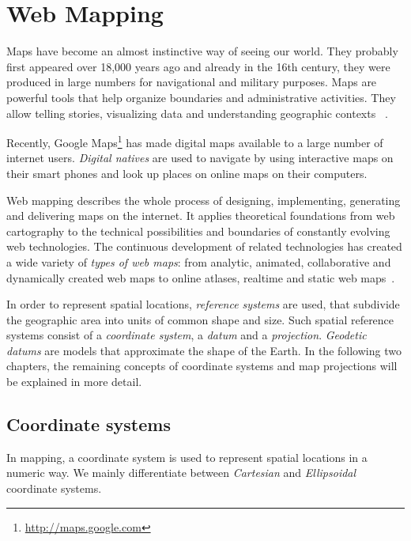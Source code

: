 
%
%

\section{Web Mapping}

Maps have become an almost instinctive way of seeing our world. They probably first appeared over 18,000 years ago and already in the 16th century, they were produced in large numbers for navigational and military purposes. Maps are powerful tools that help organize boundaries and administrative activities. They allow telling stories, visualizing data and understanding geographic contexts
~\cite{Zzolo11mappingdrupal}.

Recently, Google Maps\footnote{\url{http://maps.google.com}} has made digital maps available to a large number of internet users. \textit{Digital natives} are used to navigate by using interactive maps on their smart phones and look up places on online maps on their computers.

Web mapping describes the whole process of designing, implementing, generating and delivering maps on the internet. It applies theoretical foundations from web cartography to the technical possibilities and boundaries of constantly evolving web technologies. The continuous development of related technologies has created a wide variety of \textit{types of web maps}: from analytic, animated, collaborative and dynamically created web maps to online atlases, realtime and static web maps~\cite{wiki:web-mapping}.

In order to represent spatial locations, \textit{reference systems} are used, that subdivide the geographic area into units of common shape and size. Such spatial reference systems consist of a \textit{coordinate system}, a \textit{datum} and a \textit{projection}. \textit{Geodetic datums} are models that approximate the shape of the Earth. In the following two chapters, the remaining concepts of coordinate systems and map projections will be explained in more detail.

\subsection{Coordinate systems}
\label{chapter:coordinates}

In mapping, a coordinate system is used to represent spatial locations in a numeric way. We mainly differentiate between \textit{Cartesian} and \textit{Ellipsoidal} coordinate systems. 

